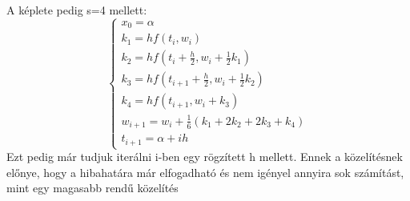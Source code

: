 \documentclass{article}
\theoremstyle{definition}
\theoremstyle{theorem}
\begin{document}
A képlete pedig s=4 mellett:
\begin{equation*}
\begin{cases}
        x_0 = \alpha \\
        k_1 = h f(t_i,w_i) \\
        k_2 = h f(t_i + \frac{h}{2}, w_i + \frac{1}{2} k_1) \\
        k_3 = h f(t_{i + 1} + \frac{h}{2}, w_i + \frac{1}{2} k_2) \\
        k_4 = h f(t_{i + 1}, w_i + k_3)\\
        w_{i+1} = w_i + \frac{1}{6}(k_1 + 2k_2 + 2k_3 + k_4)\\
        t_{i+1} = \alpha + ih
\end{cases}
\end{equation*}
Ezt pedig már tudjuk iterálni i-ben egy rögzített h mellett. Ennek a közelítésnek előnye, hogy a hibahatára már elfogadható és nem igényel annyira sok számítást, mint egy magasabb rendű közelítés
\end{document}
